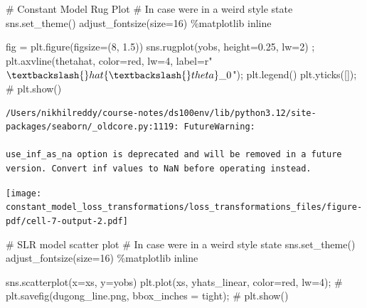 \documentclass[
  letterpaper,
  DIV=11,
  numbers=noendperiod]{scrreprt}
\newenvironment{Shaded}{\begin{snugshade}}{\end{snugshade}}
\newcommand{\CommentTok}[1]{\textcolor[rgb]{0.37,0.37,0.37}{#1}}
\newcommand{\DecValTok}[1]{\textcolor[rgb]{0.68,0.00,0.00}{#1}}
\newcommand{\FloatTok}[1]{\textcolor[rgb]{0.68,0.00,0.00}{#1}}
\newcommand{\NormalTok}[1]{\textcolor[rgb]{0.00,0.23,0.31}{#1}}
\newcommand{\OperatorTok}[1]{\textcolor[rgb]{0.37,0.37,0.37}{#1}}
\newcommand{\StringTok}[1]{\textcolor[rgb]{0.13,0.47,0.30}{#1}}
\newcommand{\VerbatimStringTok}[1]{\textcolor[rgb]{0.13,0.47,0.30}{#1}}
\begin{document}
\begin{Shaded}
\begin{Highlighting}[]
\CommentTok{\# Constant Model Rug Plot}
\CommentTok{\# In case we\textquotesingle{}re in a weird style state}
\NormalTok{sns.set\_theme()}
\NormalTok{adjust\_fontsize(size}\OperatorTok{=}\DecValTok{16}\NormalTok{)}
\OperatorTok{\%}\NormalTok{matplotlib inline}

\NormalTok{fig }\OperatorTok{=}\NormalTok{ plt.figure(figsize}\OperatorTok{=}\NormalTok{(}\DecValTok{8}\NormalTok{, }\FloatTok{1.5}\NormalTok{))}
\NormalTok{sns.rugplot(yobs, height}\OperatorTok{=}\FloatTok{0.25}\NormalTok{, lw}\OperatorTok{=}\DecValTok{2}\NormalTok{) }\OperatorTok{;}
\NormalTok{plt.axvline(thetahat, color}\OperatorTok{=}\StringTok{\textquotesingle{}red\textquotesingle{}}\NormalTok{, lw}\OperatorTok{=}\DecValTok{4}\NormalTok{, label}\OperatorTok{=}\VerbatimStringTok{r"$\textbackslash{}hat\{\textbackslash{}theta\}\_0$"}\NormalTok{)}\OperatorTok{;}
\NormalTok{plt.legend()}
\NormalTok{plt.yticks([])}\OperatorTok{;}
\CommentTok{\# plt.show()}
\end{Highlighting}
\end{Shaded}

\begin{verbatim}
/Users/nikhilreddy/course-notes/ds100env/lib/python3.12/site-packages/seaborn/_oldcore.py:1119: FutureWarning:

use_inf_as_na option is deprecated and will be removed in a future version. Convert inf values to NaN before operating instead.
\end{verbatim}

\texttt{[image: constant\_model\_loss\_transformations/loss\_transformations\_files/figure-pdf/cell-7-output-2.pdf]}

\begin{Shaded}
\begin{Highlighting}[]
\CommentTok{\# SLR model scatter plot }
\CommentTok{\# In case we\textquotesingle{}re in a weird style state}
\NormalTok{sns.set\_theme()}
\NormalTok{adjust\_fontsize(size}\OperatorTok{=}\DecValTok{16}\NormalTok{)}
\OperatorTok{\%}\NormalTok{matplotlib inline}

\NormalTok{sns.scatterplot(x}\OperatorTok{=}\NormalTok{xs, y}\OperatorTok{=}\NormalTok{yobs)}
\NormalTok{plt.plot(xs, yhats\_linear, color}\OperatorTok{=}\StringTok{\textquotesingle{}red\textquotesingle{}}\NormalTok{, lw}\OperatorTok{=}\DecValTok{4}\NormalTok{)}\OperatorTok{;}
\CommentTok{\# plt.savefig(\textquotesingle{}dugong\_line.png\textquotesingle{}, bbox\_inches = \textquotesingle{}tight\textquotesingle{});}
\CommentTok{\# plt.show()}
\end{Highlighting}
\end{Shaded}
\end{document}
